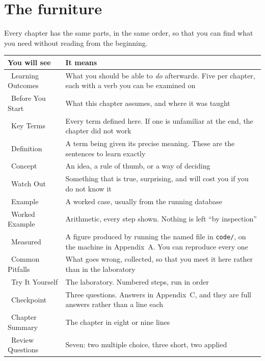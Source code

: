 \section*{The furniture}

Every chapter has the same parts, in the same order, so that you can find
what you need without reading from the beginning.

\begin{longtable}{@{}L{4.2cm}L{10.4cm}@{}}
\toprule
{}
\textbf{You will see} & \textbf{It means} \\
\midrule
\endhead
{}~Learning Outcomes & What you should be able to \emph{do}
afterwards. Five per chapter, each with a verb you can be examined on \\
~Before You Start & What this chapter assumes, and where it was
taught \\
~Key Terms & Every term defined here. If one is unfamiliar at the
end, the chapter did not work \\
~Definition & A term being given its precise meaning. These are
the sentences to learn exactly \\
~Concept & An idea, a rule of thumb, or a way of deciding \\
~Watch Out & Something that is true, surprising,
and will cost you if you do not know it \\
~Example & A worked case, usually from the running database \\
~Worked Example & Arithmetic, every step shown. Nothing is left
``by inspection'' \\
~Measured & A figure produced by running the named file
in \texttt{code/}, on the machine in Appendix~A. You can reproduce every one \\
~Common Pitfalls & What goes wrong, collected, so
that you meet it here rather than in the laboratory \\
~Try It Yourself & The laboratory. Numbered steps, run in order \\
~Checkpoint & Three questions. Answers in Appendix~C,
and they are full answers rather than a line each \\
~Chapter Summary & The chapter in eight or nine lines \\
~Review Questions & Seven: two multiple choice, three short,
two applied \\
\bottomrule
\end{longtable}

